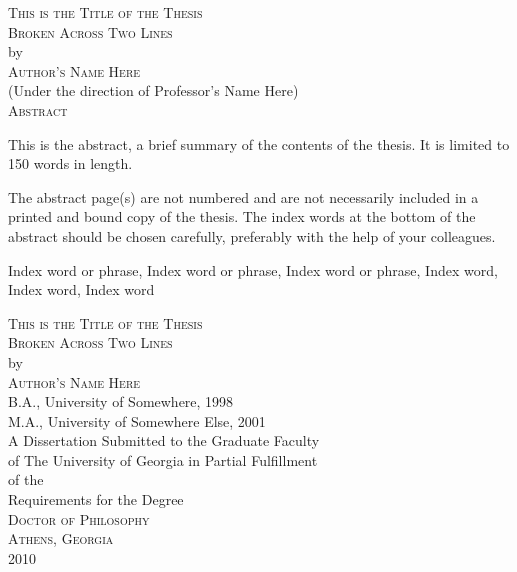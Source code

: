 \documentclass[12pt]{report}
\begin{document}
\newpage
\thispagestyle{empty}
\vspace*{18pt}
\begin{center}
\textsc{This is the Title of the Thesis\\Broken Across Two Lines}\\[18pt]
by\\[18pt]
\textsc{Author's Name Here}\\[12pt]
(Under the direction of Professor's Name Here)\\[12pt]
\textsc{Abstract}
\end{center}
This is the abstract, a brief summary of the contents of the thesis.  It 
is limited to 150 words in length.

The abstract page(s) are not numbered and are not necessarily included in a
printed and bound copy of the thesis.  The index words at the bottom of the
abstract should be chosen carefully, preferably with the help of your colleagues.

\begin{list}{\sc Index words:\hfill}{\leftmargin 1.4in}
\item 
\begin{flushleft}\singlespacing
Index word or phrase,
Index word or phrase,
Index word or phrase,
Index word, 
Index word,
Index word
\end{flushleft}
\end{list}



\newpage
\thispagestyle{empty}
\vspace*{18pt}
\begin{center}
\textsc{This is the Title of the Thesis\\Broken Across Two Lines}\\[18pt]
by\\[18pt]
\textsc{Author's Name Here}\\[12pt]
B.A., University of Somewhere, 1998\\
M.A., University of Somewhere Else, 2001\\
\vfill
A Dissertation Submitted to the Graduate Faculty \\
of The University of Georgia in Partial Fulfillment \\
of the \\
Requirements for the Degree \\[10pt]
\textsc{Doctor of Philosophy}\\[36pt]
\textsc{Athens, Georgia}\\[18pt]
2010
\end{center}
\end{document}
